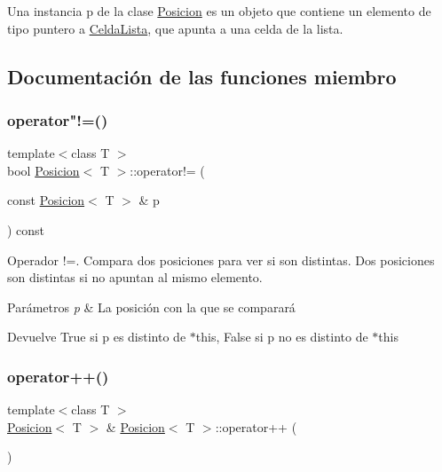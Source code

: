 Una instancia p de la clase \mbox{\hyperlink{classPosicion}{Posicion}} es un objeto que contiene un elemento de tipo puntero a \mbox{\hyperlink{structCeldaLista}{Celda\+Lista}}, que apunta a una celda de la lista. 

\subsection{Documentación de las funciones miembro}
\mbox{\label{classPosicion_aadc0745f3f50e9c6706e742fcf77fd2d}} 
\subsubsection{\texorpdfstring{operator"!=()}{operator!=()}}
{\footnotesize\ttfamily template$<$class T $>$ \\
bool \mbox{\hyperlink{classPosicion}{Posicion}}$<$ T $>$\+::operator!= (\begin{DoxyParamCaption}\item[{const \mbox{\hyperlink{classPosicion}{Posicion}}$<$ T $>$ \&}]{p }\end{DoxyParamCaption}) const}



Operador !=. Compara dos posiciones para ver si son distintas. Dos posiciones son distintas si no apuntan al mismo elemento. 


\begin{DoxyParams}{Parámetros}
{\em p} & La posición con la que se comparará \\
\hline
\end{DoxyParams}
\begin{DoxyReturn}{Devuelve}
True si p es distinto de $\ast$this, False si p no es distinto de $\ast$this 
\end{DoxyReturn}
\mbox{\label{classPosicion_adcd8a716e798d29d8c2832d0c6ee020b}} 
\subsubsection{\texorpdfstring{operator++()}{operator++()}\hspace{0.1cm}{\footnotesize\ttfamily [1/2]}}
{\footnotesize\ttfamily template$<$class T $>$ \\
\mbox{\hyperlink{classPosicion}{Posicion}}$<$ T $>$ \& \mbox{\hyperlink{classPosicion}{Posicion}}$<$ T $>$\+::operator++ (\begin{DoxyParamCaption}{ }\end{DoxyParamCaption})}



